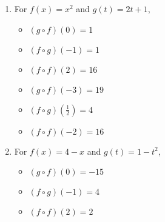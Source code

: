 \documentclass{ximera}
\begin{document}
\begin{enumerate}

\item  For  $f(x) = x^2$ and $g(t) = 2t+1$,
\begin{multicols}{3}

\begin{itemize}

\item  $(g\circ f)(0) = 1$

\item  $(f\circ g)(-1) = 1$

\item  $(f \circ f)(2) = 16$

\end{itemize}

\end{multicols}

\begin{multicols}{3}

\begin{itemize}

\item  $(g\circ f)(-3) = 19$

\item  $(f\circ g)\left(\frac{1}{2}\right) = 4$

\item  $(f \circ f)(-2) = 16$

\end{itemize}

\end{multicols}

\item  For   $f(x) = 4-x$ and $g(t) = 1-t^2$,
\begin{multicols}{3}

\begin{itemize}

\item  $(g\circ f)(0) = -15$

\item  $(f\circ g)(-1) = 4$

\item  $(f \circ f)(2) = 2$

\end{itemize}

\end{multicols}

\begin{multicols}{3}

\begin{itemize}


\end{itemize}
\end{multicols}
\end{enumerate}
\end{document}
